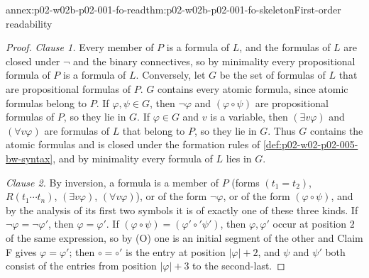 \begin{annexitem}{annex:p02-w02b-p02-001-fo-read}{thm:p02-w02b-p02-001-fo-skeleton}{First-order readability}
\begin{proof}
\emph{Clause 1.}  Every member of \(P\) is a formula of \(L\), and the
formulas of \(L\) are closed under \(\neg\) and the binary connectives, so
by minimality every propositional formula of \(P\) is a formula of \(L\).
Conversely, let \(G\) be the set of formulas of \(L\) that are propositional
formulas of \(P\).  \(G\) contains every atomic formula, since atomic
formulas belong to \(P\).  If \(\varphi,\psi\in G\), then \(\neg\varphi\)
and \((\varphi\circ\psi)\) are propositional formulas of \(P\), so they lie
in \(G\).  If \(\varphi\in G\) and \(v\) is a variable, then
\((\exists v\varphi)\) and \((\forall v\varphi)\) are formulas of \(L\) that
belong to \(P\), so they lie in \(G\).  Thus \(G\) contains the atomic
formulas and is closed under the formation rules of \cref{def:p02-w02-p02-005-bw-syntax}, and by
minimality every formula of \(L\) lies in \(G\).

\emph{Clause 2.}  By inversion, a formula is a member of \(P\) (forms
\((t_1=t_2)\), \(R(t_1\cdots t_n)\), \((\exists v\varphi)\),
\((\forall v\varphi)\)), or of the form \(\neg\varphi\), or of the form
\((\varphi\circ\psi)\), and by the analysis of its first two symbols it is
of exactly one of these three kinds.  If \(\neg\varphi=\neg\varphi'\), then
\(\varphi=\varphi'\).  If \((\varphi\circ\psi)=(\varphi'\circ'\psi')\), then
\(\varphi,\varphi'\) occur at position \(2\) of the same expression, so by
(O) one is an initial segment of the other and Claim F gives
\(\varphi=\varphi'\); then \(\circ=\circ'\) is the entry at position
\(|\varphi|+2\), and \(\psi\) and \(\psi'\) both consist of the entries from
position \(|\varphi|+3\) to the second-last.
\end{proof}
\end{annexitem}

